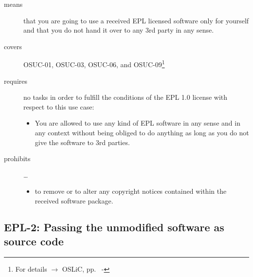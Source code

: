 \begin{description}

\item[means] that you are going to use a received EPL licensed software only
for yourself and that you do not hand it over to any 3rd party in any sense.

\item[covers] OSUC-01, OSUC-03, OSUC-06, and OSUC-09\footnote{For details 
$\rightarrow$ OSLiC, pp.\ \pageref{OSUC-01-DEF} - \pageref{OSUC-09-DEF}}

\item[requires] no tasks in order to fulfill the conditions of the EPL 1.0
license with respect to this use case:
  \begin{itemize}
    \item You are allowed to use any kind of EPL software in any sense and in
    any context without being obliged to do anything as long as you do not
    give the software to 3rd parties.
  \end{itemize}

\item[prohibits] \ldots
\begin{itemize}
  \item to remove or to alter any copyright notices contained within the
  received software package.
\end{itemize}

\end{description}

\subsection{EPL-2: Passing the unmodified software as source code}
\label{OSUC-02S-EPL} \label{OSUC-05S-EPL} \label{OSUC-07S-EPL} 

